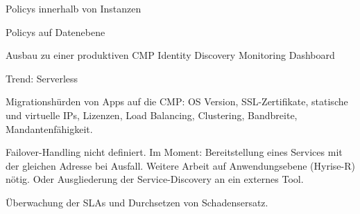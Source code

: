 Policys innerhalb von Instanzen 

Policys auf Datenebene

Ausbau zu einer produktiven CMP
Identity
Discovery
Monitoring
Dashboard

Trend: Serverless

Migrationshürden von Apps auf die CMP: OS Version, SSL-Zertifikate, statische und virtuelle IPs, Lizenzen, Load Balancing, Clustering, Bandbreite, Mandantenfähigkeit.

Failover-Handling nicht definiert. Im Moment: Bereitstellung eines Services mit der gleichen Adresse bei Ausfall. Weitere Arbeit auf Anwendungsebene (Hyrise-R) nötig. Oder Ausgliederung der Service-Discovery an ein externes Tool.

Überwachung der SLAs und Durchsetzen von Schadensersatz.
